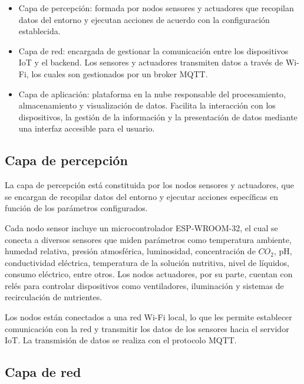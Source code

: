 \begin{itemize}
    \item Capa de percepción: formada por nodos sensores y actuadores que recopilan datos
          del entorno y ejecutan acciones de acuerdo con la configuración establecida.
    \item Capa de red: encargada de gestionar la comunicación entre los dispositivos IoT
          y el backend. Los sensores y actuadores transmiten datos a través de Wi-Fi, los
          cuales son gestionados por un broker MQTT.
    \item Capa de aplicación: plataforma en la nube responsable del procesamiento,
          almacenamiento y visualización de datos. Facilita la interacción con los
          dispositivos, la gestión de la información y la presentación de datos mediante
          una interfaz accesible para el usuario.
\end{itemize}

\subsection{Capa de percepción}

La capa de percepción está constituida por los nodos sensores y actuadores, que
se encargan de recopilar datos del entorno y ejecutar acciones específicas en
función de los parámetros configurados.

Cada nodo sensor incluye un microcontrolador ESP-WROOM-32, el cual se conecta a
diversos sensores que miden parámetros como temperatura ambiente, humedad
relativa, presión atmosférica, luminosidad, concentración de $CO_2$, pH,
conductividad eléctrica, temperatura de la solución nutritiva, nivel de
líquidos, consumo eléctrico, entre otros. Los nodos actuadores, por su parte,
cuentan con relés para controlar dispositivos como ventiladores, iluminación y
sistemas de recirculación de nutrientes.

Los nodos están conectados a una red Wi-Fi local, lo que les permite establecer
comunicación con la red y transmitir los datos de los sensores hacia el
servidor IoT. La transmisión de datos se realiza con el protocolo MQTT.


\subsection{Capa de red}

